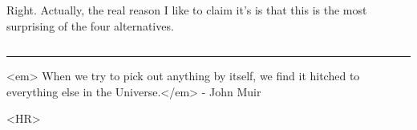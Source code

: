 Right.  Actually, the real reason I like to claim it's \Lambda 
is that this is the most surprising of the four alternatives.

$$
    
\par\noindent\rule{\textwidth}{0.4pt}
<em> When we try to pick out anything by itself, we find it hitched 
to everything else in the Universe.</em> - John Muir

<HR>



